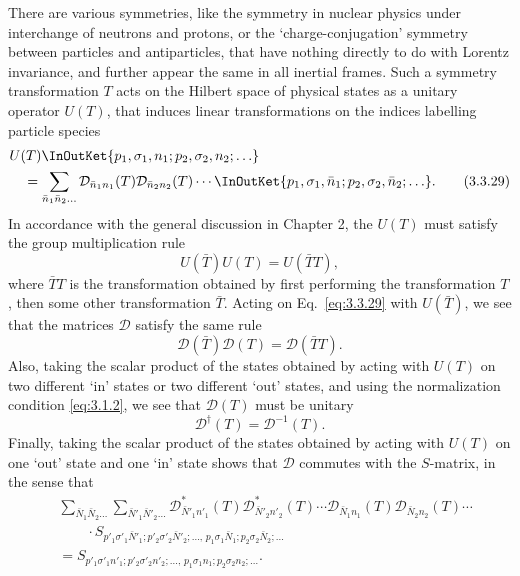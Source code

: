 There are various symmetries, like the symmetry in nuclear physics under
interchange of neutrons and protons, or the `charge-conjugation' symmetry between
particles and antiparticles, that have nothing directly to do with Lorentz
invariance, and further appear the same in all inertial frames. Such a symmetry
transformation $T$ acts on the Hilbert space of physical states as a unitary
operator $U(T)$, that induces linear transformations on the indices labelling
particle species
\begin{align}
&U(T)\InOutKet{p_1,\sigma_1,n_1;p_2,\sigma_2,n_2;\ldots}
\nonumber\\
&\quad=\sum_{\bar n_1\bar n_2\ldots}
\mathcal{D}_{\bar n_1n_1}(T)\mathcal{D}_{\bar n_2n_2}(T)\cdots
\InOutKet{p_1,\sigma_1,\bar n_1;p_2,\sigma_2,\bar n_2;\ldots}.
\tag{3.3.29}\label{eq:3.3.29}
\end{align}
In accordance with the general discussion in Chapter 2, the $U(T)$ must satisfy
the group multiplication rule
\begin{equation}
U(\bar T)U(T)=U(\bar TT),
\tag{3.3.30}\label{eq:3.3.30}
\end{equation}
where $\bar TT$ is the transformation obtained by first performing the
transformation $T$, then some other transformation $\bar T$. Acting on
Eq.~\eqref{eq:3.3.29} with $U(\bar T)$, we see that the matrices $\mathcal{D}$ satisfy the
same rule
\begin{equation}
\mathcal{D}(\bar T)\mathcal{D}(T)=\mathcal{D}(\bar TT).
\tag{3.3.31}\label{eq:3.3.31}
\end{equation}
Also, taking the scalar product of the states obtained by acting with $U(T)$ on
two different `in' states or two different `out' states, and using the
normalization condition \eqref{eq:3.1.2}, we see that $\mathcal{D}(T)$ must be unitary
\begin{equation}
\mathcal{D}^\dagger(T)=\mathcal{D}^{-1}(T).
\tag{3.3.32}\label{eq:3.3.32}
\end{equation}
Finally, taking the scalar product of the states obtained by acting with $U(T)$
on one `out' state and one `in' state shows that $\mathcal{D}$ commutes with the
$S$-matrix, in the sense that
\begin{align}
&\sum_{\bar N_1\bar N_2\ldots}
\sum_{\bar N'_1\bar N'_2\ldots}
\mathcal{D}^*_{\bar N'_1n'_1}(T)\mathcal{D}^*_{\bar N'_2n'_2}(T)\cdots
\mathcal{D}_{\bar N_1n_1}(T)\mathcal{D}_{\bar N_2n_2}(T)\cdots
\nonumber\\
&\qquad\cdot
S_{p'_1\sigma'_1\bar N'_1;p'_2\sigma'_2\bar N'_2;\ldots,\,
p_1\sigma_1\bar N_1;p_2\sigma_2\bar N_2;\ldots}
\nonumber\\
&=S_{p'_1\sigma'_1n'_1;p'_2\sigma'_2n'_2;\ldots,\,
p_1\sigma_1n_1;p_2\sigma_2n_2;\ldots}.
\tag{3.3.33}\label{eq:3.3.33}
\end{align}

